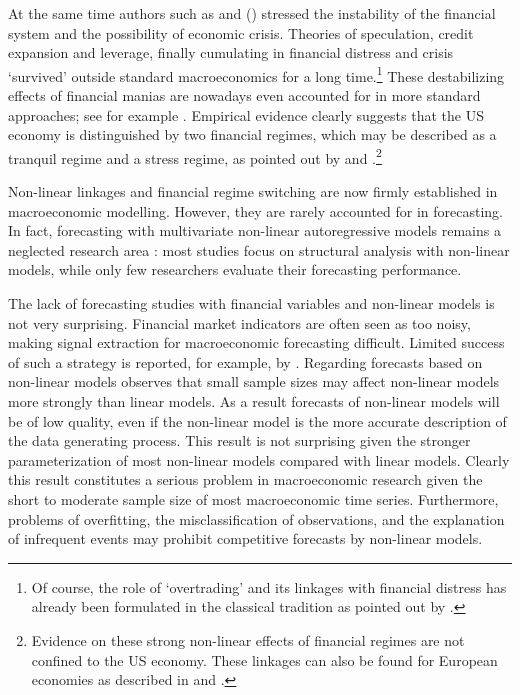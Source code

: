 \documentclass[12pt,letterpaper,fleqn]{article}           %
\begin{document}
At the same time authors such as \textcite{aliber15} and \citeauthor{minsky82} (\citeyear{minsky82, minsky08}) stressed the instability of the financial system and the possibility of economic crisis. Theories of speculation, credit expansion and leverage, finally cumulating in financial distress and crisis `survived' outside standard macroeconomics for a long time.\footnote{Of course, the role of `overtrading' and its linkages with financial distress has already been formulated in the classical tradition as pointed out by \textcite{aliber15}.}
These destabilizing effects of financial manias are nowadays even accounted for in more standard approaches; see for example \textcite{brunnermeier14}. Empirical evidence clearly suggests that the US economy is distinguished by two financial regimes, which may be described as a tranquil regime and a stress regime, as pointed out by \textcite{he14} and \textcite{mittnik13}.\footnote{Evidence on these strong non-linear effects of financial regimes are not confined to the US economy. These linkages can also be found for European economies as described in \textcite{mittnik13} and \textcite{schleer15}.}

Non-linear linkages and financial regime switching are now firmly established in macroeconomic modelling. However, they are rarely accounted for in forecasting. In fact, forecasting with multivariate non-linear autoregressive models remains a neglected research area \parencite{hubrich13}: most studies focus on structural analysis with non-linear models, while only few researchers evaluate their forecasting performance. 

The lack of forecasting studies with financial variables and non-linear models is not very surprising. Financial market indicators are often seen as too noisy, making signal extraction for macroeconomic forecasting difficult. Limited success of such a strategy is reported, for example, by \textcite{stock03}. Regarding forecasts based on non-linear models \textcite{ter06} observes that small sample sizes may affect non-linear models more strongly than linear models. As a result forecasts of non-linear models will be of low quality, even if the non-linear model is the more accurate description of the data generating process. This result is not surprising given the stronger parameterization of most non-linear models compared with linear models. Clearly this result constitutes a serious problem in macroeconomic research given the short to moderate sample size of most macroeconomic time series. Furthermore, problems of overfitting, the misclassification of observations, and the explanation of infrequent events may prohibit competitive forecasts by non-linear models. 
\end{document}
